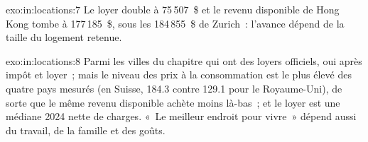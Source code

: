 \begin{solution}{exo:in:locations:7}
Le loyer double à 75\,507~\$ et le revenu disponible de Hong Kong tombe à 177\,185~\$, sous les 184\,855~\$ de Zurich~: l'avance
dépend de la taille du logement retenue.
\end{solution}

\begin{solution}{exo:in:locations:8}
Parmi les villes du chapitre qui ont des loyers officiels, oui après impôt et loyer~; mais le niveau des prix à la consommation est
le plus élevé des quatre pays mesurés (en Suisse, 184.3 contre 129.1 pour le Royaume-Uni), de sorte que le même revenu disponible achète
moins là-bas~; et le loyer est une médiane 2024 nette de charges. «~Le meilleur endroit pour vivre~» dépend aussi du travail, de la famille et des goûts.
\end{solution}

